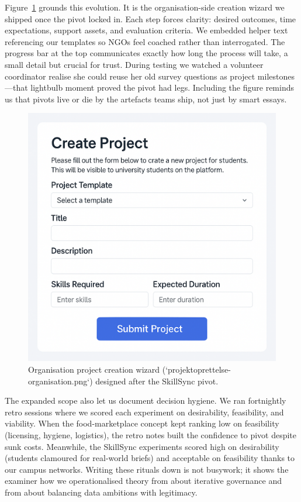 Figure~\ref{fig:project-creation} grounds this evolution. It is the organisation-side creation wizard we shipped once the pivot locked in. Each step forces clarity: desired outcomes, time expectations, support assets, and evaluation criteria. We embedded helper text referencing our templates so NGOs feel coached rather than interrogated. The progress bar at the top communicates exactly how long the process will take, a small detail but crucial for trust. During testing we watched a volunteer coordinator realise she could reuse her old survey questions as project milestones---that lightbulb moment proved the pivot had legs. Including the figure reminds us that pivots live or die by the artefacts teams ship, not just by smart essays.

\begin{figure}[h]
  \centering
  \includegraphics[width=0.85\linewidth]{figures/projektoprettelse-organisation.png}
  \caption{Organisation project creation wizard (`projektoprettelse-organisation.png`) designed after the SkillSync pivot.}
  \label{fig:project-creation}
\end{figure}

The expanded scope also let us document decision hygiene. We ran fortnightly retro sessions where we scored each experiment on desirability, feasibility, and viability. When the food-marketplace concept kept ranking low on feasibility (licensing, hygiene, logistics), the retro notes built the confidence to pivot despite sunk costs. Meanwhile, the SkillSync experiments scored high on desirability (students clamoured for real-world briefs) and acceptable on feasibility thanks to our campus networks. Writing these rituals down is not busywork; it shows the examiner how we operationalised theory from \citet{Choudary2016} about iterative governance and from \citet{Srnicek2017} about balancing data ambitions with legitimacy.
